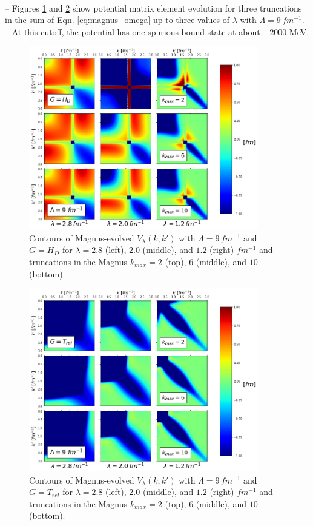 \documentclass[preprintnumbers,floatfix,aps,prc,preprint,nofootinbib]{revtex4-1}
\begin{document}
\\
-- Figures \ref{fig:magnus_contours_Wendt_Lamb9_Wegner} and \ref{fig:magnus_contours_Wendt_Lamb9_T} show potential matrix element evolution for three truncations in the sum of Eqn. \ref{eq:magnus_omega} up to three values of $\lambda$ with $\Lambda=9 \, fm^{-1}$.
\\
-- At this cutoff, the potential has one spurious bound state at about $-2000$ MeV.
\\
%	
\begin{figure}
	\captionsetup{singlelinecheck=false,justification=raggedright}
	\centering
	\includegraphics[width=10cm]{magnus_contours_Wendt_Lamb9_Wegner}
	\hspace*{0.05\textwidth}
	\caption{Contours of Magnus-evolved $V_{\lambda}(k,k')$ with $\Lambda=9 \, fm^{-1}$ and $G=H_{D}$ for $\lambda=2.8$ (left), $2.0$ (middle), and $1.2$ (right) $fm^{-1}$ and truncations in the Magnus $k_{max}=2$ (top), $6$ (middle), and $10$ (bottom).}
	\label{fig:magnus_contours_Wendt_Lamb9_Wegner}
\end{figure}
%
\begin{figure}
	\captionsetup{singlelinecheck=false,justification=raggedright}
	\centering
	\includegraphics[width=10cm]{magnus_contours_Wendt_Lamb9_T}
  	\hspace*{0.05\textwidth}
  	\caption{Contours of Magnus-evolved $V_{\lambda}(k,k')$ with $\Lambda=9 \, fm^{-1}$ and $G=T_{rel}$ for $\lambda=2.8$ (left), $2.0$ (middle), and $1.2$ (right) $fm^{-1}$ and truncations in the Magnus $k_{max}=2$ (top), $6$ (middle), and $10$ (bottom).}
  	\label{fig:magnus_contours_Wendt_Lamb9_T}
\end{figure}
\end{document}
